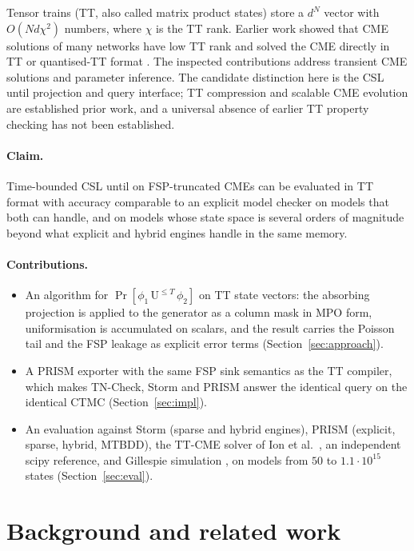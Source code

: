 \documentclass[11pt]{article}
\begin{document}
Tensor trains (TT, also called matrix product states) \cite{oseledets2011tt} store a
$d^N$ vector with $O(N d \chi^2)$ numbers, where $\chi$ is the TT rank. Earlier work
showed that CME solutions of many networks have low TT rank and solved the CME
directly in TT or quantised-TT format
\cite{kazeev2014qtt,dolgov2015state,ion2021ttcme}. The inspected contributions address transient CME solutions and parameter
inference. The candidate distinction here is the CSL until projection and
query interface; TT compression and scalable CME evolution are established
prior work, and a universal absence of earlier TT property checking has not
been established.

\paragraph{Claim.} Time-bounded CSL until on FSP-truncated CMEs can be evaluated in
TT format with accuracy comparable to an explicit model checker on models that
both can handle, and on models whose state space is several orders of magnitude
beyond what explicit and hybrid engines handle in the same memory.

\paragraph{Contributions.}
\begin{itemize}
\item An algorithm for $\Pr[\phi_1\,\mathrm{U}^{\le T}\,\phi_2]$ on TT state vectors:
  the absorbing projection is applied to the generator as a column mask in MPO
  form, uniformisation is accumulated on scalars, and the result carries the Poisson
  tail and the FSP leakage as explicit error terms (Section~\ref{sec:approach}).
\item A PRISM exporter with the same FSP sink semantics as the TT compiler, which
  makes TN-Check, Storm and PRISM answer the identical query on the identical CTMC
  (Section~\ref{sec:impl}).
\item An evaluation against Storm (sparse and hybrid engines), PRISM (explicit,
  sparse, hybrid, MTBDD), the TT-CME solver of Ion et al.\ \cite{ion2021ttcme}, an
  independent scipy reference, and Gillespie simulation \cite{gillespie1977ssa},
  on models from $50$ to $1.1\cdot10^{15}$ states (Section~\ref{sec:eval}).
\end{itemize}

\section{Background and related work}
\end{document}
